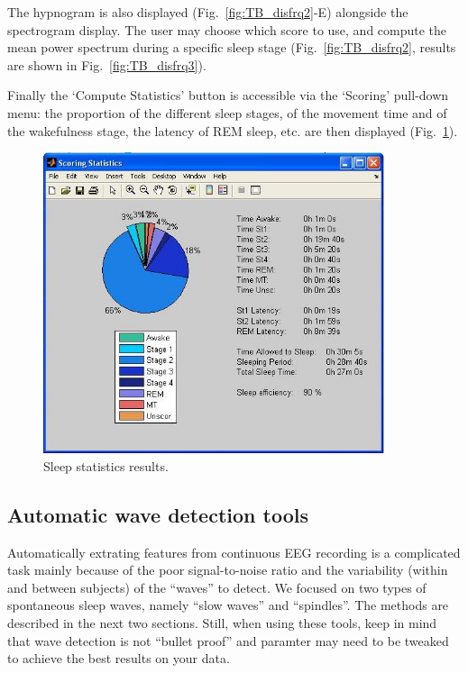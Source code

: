 \documentclass[a4paper,titlepage]{article}
\begin{document}
The hypnogram is also displayed (Fig.~\ref{fig:TB_disfrq2}-E) alongside the spectrogram display. The user may choose which score to use, and compute the mean power spectrum during a specific sleep stage (Fig.~\ref{fig:TB_disfrq2}, results are shown in Fig.~\ref{fig:TB_disfrq3}).

Finally the `Compute Statistics' button is accessible via the `Scoring' pull-down menu: the proportion of the different sleep stages, of the movement time and of the wakefulness stage, the latency of REM sleep, etc. are then displayed (Fig.~\ref{fig:TB_dis_score2}).

\begin{figure}[ht]
	\centering
		\includegraphics[width=10cm]{images/FIG12_score_stats.jpg}
	\caption{Sleep statistics results.
	\label{fig:TB_dis_score2}}
\end{figure}


\subsection{Automatic wave detection tools}
\label{sec:WaveDetect}

Automatically extrating features from continuous EEG recording is a complicated task mainly because of the poor signal-to-noise ratio and the variability (within and between subjects) of the ``waves'' to detect. We focused on two types of spontaneous sleep waves, namely ``slow waves'' and ``spindles''. The methods are described in the next two sections. Still, when using these tools, keep in mind that wave detection is not ``bullet proof'' and paramter may need to be tweaked to achieve the best results on your data.
\end{document}

